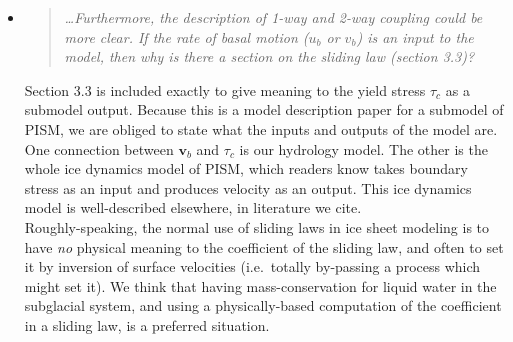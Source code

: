 \documentclass[11pt,reqno]{amsart}
\newcommand{\reply}[2]{
\medskip\medskip
\item  \begin{quote}
\emph{#1}
\end{quote}

\medskip
\noindent #2}
\begin{document}
\begin{itemize}
\reply{\dots  Furthermore, the description of 1-way and 2-way coupling could be more clear. If the rate of basal motion ($u_b$ or $v_b$) is an input to the model, then why is there a section on the sliding law (section 3.3)?}
{Section 3.3 is included exactly to give meaning to the yield stress $\tau_c$ as a submodel output.  Because this is a model description paper for a submodel of PISM, we are obliged to state what the inputs and outputs of the model are.\\
\indent One connection between $\mathbf{v}_b$ and $\tau_c$ is our hydrology model.  The other is the whole ice dynamics model of PISM, which readers know takes boundary stress as an input and produces velocity as an output.  This ice dynamics model is well-described elsewhere, in literature we cite. \\
\indent Roughly-speaking, the normal use of sliding laws in ice sheet modeling is to have \emph{no} physical meaning to the coefficient of the sliding law, and often to set it by inversion of surface velocities (i.e.~totally by-passing a process which might set it).  We think that having mass-conservation for liquid water in the subglacial system, and using a physically-based computation of the coefficient in a sliding law, is a preferred situation.}


\end{itemize}
\end{document}
